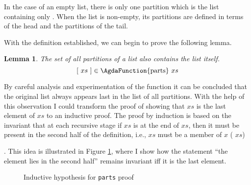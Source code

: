 \documentclass[12pt,a4paper,twoside,openright]{report}
\newcommand{\C}{\AgdaInductiveConstructor}
\newcommand{\F}{\AgdaFunction}
\newtheorem{lemma}{Lemma}[section]
\begin{document}
{In the case of an empty list, there is only one partition which is the list containing only \C{[]}. When the list is non-empty, its partitions are defined in terms of the head and the partitions of the tail. 

With the definition established, we can begin to prove the following lemma.

\begin{lemma}
The set of all partitions of a list also contains the list itself.
$$[\ xs\ ] \in \textrm{\F{parts}}\ xs$$
\end{lemma}

By careful analysis and experimentation of the \F{parts} function it can be concluded that the original list always appears last in the list of all partitions. With the help of this observation I could transform the proof of showing that {\F{[} $xs$ \F{]}} is the last element of \F{parts} $xs$ to an inductive proof. The proof by induction is based on the invariant that at each recursive stage if {$xs$} is at the end of \F{parts} $xs$, then it must be present in the second half of the definition, i.e., {$xs$} must be a member of \F{parts-filter} $x$ (\F{parts} $xs$)}. This idea is illustrated in Figure \ref{fig:parts}, where I show how the statement ``the element lies in the second half'' remains invariant iff it is the last element.
\begin{figure}[t] 
\begin{center}
\end{center}
\caption{Inductive hypothesis for {\tt parts} proof}
\label{fig:parts}
\end{figure}
\end{document}
